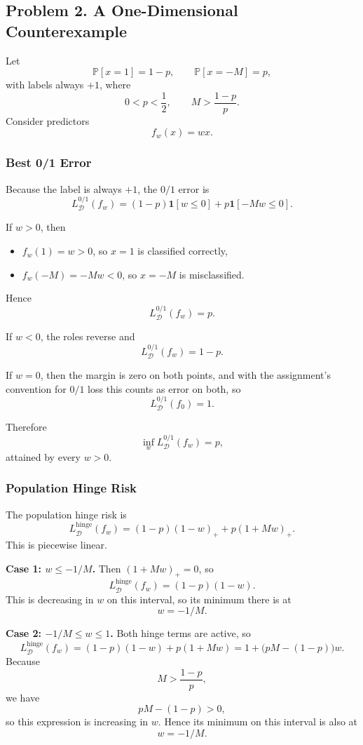 \documentclass{article}
\newcommand{\PP}{\mathbb{P}}
\newcommand{\cD}{\mathcal{D}}
\newcommand{\one}{\mathbf{1}}
\begin{document}
\subsection{Problem 2. A One-Dimensional Counterexample}

Let
$$
\PP[x=1]=1-p,
\qquad
\PP[x=-M]=p,
$$
with labels always $+1$, where
$$
0<p<\frac12,
\qquad
M>\frac{1-p}{p}.
$$
Consider predictors
$$
f_w(x)=wx.
$$

\subsubsection{Best 0/1 Error}

Because the label is always $+1$, the $0/1$ error is
$$
L_{\cD}^{0/1}(f_w)
=
(1-p)\one[w\le 0] + p\one[-Mw\le 0].
$$

If $w>0$, then
\begin{itemize}
\item $f_w(1)=w>0$, so $x=1$ is classified correctly,
\item $f_w(-M)=-Mw<0$, so $x=-M$ is misclassified.
\end{itemize}
Hence
$$
L_{\cD}^{0/1}(f_w)=p.
$$

If $w<0$, the roles reverse and
$$
L_{\cD}^{0/1}(f_w)=1-p.
$$

If $w=0$, then the margin is zero on both points, and with the assignment's convention for $0/1$ loss this counts as error on both, so
$$
L_{\cD}^{0/1}(f_0)=1.
$$

Therefore
$$
\inf_w L_{\cD}^{0/1}(f_w)=p,
$$
attained by every $w>0$.

\subsubsection{Population Hinge Risk}

The population hinge risk is
$$
L_{\cD}^{\mathrm{hinge}}(f_w)
=
(1-p)(1-w)_+ + p(1+Mw)_+.
$$
This is piecewise linear.

\textbf{Case 1: $w\le -1/M$.}
Then $(1+Mw)_+=0$, so
$$
L_{\cD}^{\mathrm{hinge}}(f_w)=(1-p)(1-w).
$$
This is decreasing in $w$ on this interval, so its minimum there is at
$$
w=-1/M.
$$

\textbf{Case 2: $-1/M\le w\le 1$.}
Both hinge terms are active, so
$$
L_{\cD}^{\mathrm{hinge}}(f_w)
=
(1-p)(1-w)+p(1+Mw)
=
1 + \bigl(pM-(1-p)\bigr)w.
$$
Because
$$
M>\frac{1-p}{p},
$$
we have
$$
pM-(1-p)>0,
$$
so this expression is increasing in $w$. Hence its minimum on this interval is also at
$$
w=-1/M.
$$
\end{document}

